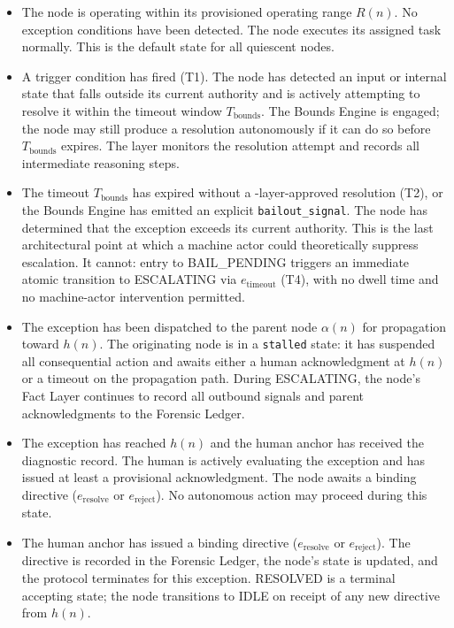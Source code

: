 \begin{itemize}
\item[\textbf{IDLE.}] The node is operating within its provisioned operating range $R(n)$. No exception conditions have been detected. The node executes its assigned task normally. This is the default state for all quiescent nodes.

\item[\textbf{BOUNDED.}] A trigger condition has fired (T1). The node has detected an input or internal state that falls outside its current authority and is actively attempting to resolve it within the timeout window $T_{\text{bounds}}$. The Bounds Engine is engaged; the node may still produce a resolution autonomously if it can do so before $T_{\text{bounds}}$ expires. The \fact{} layer monitors the resolution attempt and records all intermediate reasoning steps.

\item[\textbf{BAIL\_PENDING.}] The timeout $T_{\text{bounds}}$ has expired without a \fact-layer-approved resolution (T2), or the Bounds Engine has emitted an explicit \texttt{bailout\_signal}. The node has determined that the exception exceeds its current authority. This is the last architectural point at which a machine actor could theoretically suppress escalation. It cannot: entry to BAIL\_PENDING triggers an immediate atomic transition to ESCALATING via $e_{\text{timeout}}$ (T4), with no dwell time and no machine-actor intervention permitted.

\item[\textbf{ESCALATING.}] The exception has been dispatched to the parent node $\alpha(n)$ for propagation toward $h(n)$. The originating node is in a \texttt{stalled} state: it has suspended all consequential action and awaits either a human acknowledgment at $h(n)$ or a timeout on the propagation path. During ESCALATING, the node's Fact Layer continues to record all outbound signals and parent acknowledgments to the Forensic Ledger.

\item[\textbf{HUMAN\_ACKNOWLEDGED.}] The exception has reached $h(n)$ and the human anchor has received the diagnostic record. The human is actively evaluating the exception and has issued at least a provisional acknowledgment. The node awaits a binding directive ($e_{\text{resolve}}$ or $e_{\text{reject}}$). No autonomous action may proceed during this state.

\item[\textbf{RESOLVED.}] The human anchor has issued a binding directive ($e_{\text{resolve}}$ or $e_{\text{reject}}$). The directive is recorded in the Forensic Ledger, the node's state is updated, and the protocol terminates for this exception. RESOLVED is a terminal accepting state; the node transitions to IDLE on receipt of any new directive from $h(n)$.
\end{itemize}

